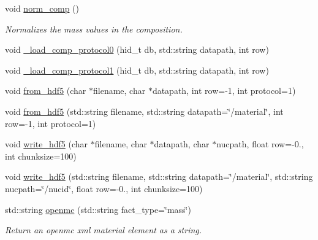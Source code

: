 \begin{DoxyCompactItemize}
\mbox{\label{classpyne_1_1_material_a1d4f70382d3c4ad060977de853d23d6c}} 
void \hyperlink{classpyne_1_1_material_a1d4f70382d3c4ad060977de853d23d6c}{norm\+\_\+comp} ()
\begin{DoxyCompactList}\small\item\em Normalizes the mass values in the composition. \end{DoxyCompactList}\item 
void \hyperlink{classpyne_1_1_material_a53c124ac70017813b4893a2f7fe3db6a}{\+\_\+load\+\_\+comp\+\_\+protocol0} (hid\+\_\+t db, std\+::string datapath, int row)
\item 
void \hyperlink{classpyne_1_1_material_a8b46ba10cebb01cd36a5379e363267b1}{\+\_\+load\+\_\+comp\+\_\+protocol1} (hid\+\_\+t db, std\+::string datapath, int row)
\item 
void \hyperlink{classpyne_1_1_material_a8f06385fde86492d1291b35fa982c753}{from\+\_\+hdf5} (char $\ast$filename, char $\ast$datapath, int row=-\/1, int protocol=1)
\item 
void \hyperlink{classpyne_1_1_material_ac6bc51ed739f2f735467baf14716d825}{from\+\_\+hdf5} (std\+::string filename, std\+::string datapath=\char`\"{}/material\char`\"{}, int row=-\/1, int protocol=1)
\item 
void \hyperlink{classpyne_1_1_material_adf226509fcdbf44476019fde3ff2f6ee}{write\+\_\+hdf5} (char $\ast$filename, char $\ast$datapath, char $\ast$nucpath, float row=-\/0., int chunksize=100)
\item 
void \hyperlink{classpyne_1_1_material_a9c5e1c52faafe841ff2227d08ba7aaf7}{write\+\_\+hdf5} (std\+::string filename, std\+::string datapath=\char`\"{}/material\char`\"{}, std\+::string nucpath=\char`\"{}/nucid\char`\"{}, float row=-\/0., int chunksize=100)
\item 
\mbox{\label{classpyne_1_1_material_a0d712a1714e15c339b19c020658ff83d}} 
std\+::string \hyperlink{classpyne_1_1_material_a0d712a1714e15c339b19c020658ff83d}{openmc} (std\+::string fact\+\_\+type=\char`\"{}mass\char`\"{})
\begin{DoxyCompactList}\small\item\em Return an openmc xml material element as a string. \end{DoxyCompactList}\item 
\mbox{\label{classpyne_1_1_material_ac30ed9f082dc76a0c535eb9237a6c528}} 

\end{DoxyCompactItemize}
